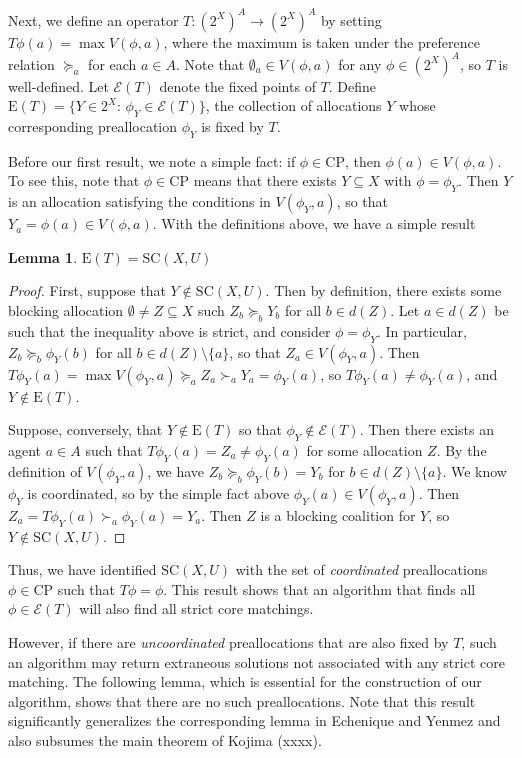 \documentclass[11pt,reqno]{amsart}
\newtheorem{lemma}[thm]{Lemma}
\theoremstyle{definition}
\numberwithin{equation}{section}
\newcommand{\prf}{\begin{proof}}
\newcommand{\eprf}{\end{proof}}
\newcommand{\pre}{\phi}
\newcommand{\coordpre}{\mathrm{CP}}
\newcommand{\prealloc}{(2^X)^A}
\newcommand{\sub}{\subseteq}
\newcommand{\strcore}{\mathrm{SC}(X,U)}
\newcommand{\fecon}{\mathrm{E}}
\newcommand{\fix}{\mathcal{E}}
\newcommand{\suq}{\succeq}
\newcommand{\su}{\succ}
\begin{document}
Next, we define an operator $T: \prealloc \to \prealloc$ by setting $T \pre(a) = \max V(\pre, a)$, where the maximum is taken under the preference relation $\suq_a$ for each $a \in A$.
Note that $\emptyset_a \in V(\pre,a)$ for any $\pre \in \prealloc$, so $T$ is well-defined. Let $\fix(T)$ denote the fixed points of $T$. Define $\fecon(T) = \{Y \in 2^X: \, \pre_Y \in \fix(T)\}$, the collection of allocations $Y$ whose corresponding preallocation $\pre_Y$ is fixed by $T$.

Before our first result, we note a simple fact: if $\pre \in \coordpre$, then $\pre(a) \in V(\pre, a)$.
To see this, note that $\pre \in \coordpre$ means that there exists $Y \sub X$ with $\pre = \pre_Y$. 
Then $Y$ is an allocation satisfying the conditions in $V(\pre_Y,a)$, so that $Y_a  = \pre(a) \in V(\pre,a)$. 
With the definitions above, we have a simple result
\begin{lemma} \label{lemma:strictcore}
$\fecon(T) = \strcore$
\end{lemma}
\prf
First, suppose that $Y \not \in \strcore$. Then by definition, there exists some blocking allocation $\emptyset \not = Z \sub X$ such $Z_b \suq_b Y_b$ for all $b \in d(Z)$.
Let $a \in d(Z)$ be such that the inequality above is strict, and consider $\pre = \pre_Y$. 
In particular, $Z_b \suq_b \pre_Y(b)$ for all $b \in d(Z) \setminus \{a\}$, so that $Z_a \in V(\pre_Y, a)$.
Then $T \pre_Y(a) = \max V(\pre_Y, a) \suq_a Z_a \su_a Y_a = \pre_Y(a)$, so $T\pre_Y(a) \not = \pre_Y(a)$, and $Y \not \in \fecon(T)$.  

Suppose, conversely, that $Y \not \in \fecon(T)$ so that $\pre_Y \not \in \fix(T)$.  
Then there exists an agent $a \in A$ such that $T\pre_Y(a) = Z_a \not = \pre_Y(a)$ for some allocation $Z$.  
By the definition of $V(\pre_Y,a)$, we have $Z_b \suq_b \pre_Y(b) = Y_b$ for $b \in d(Z) \setminus \{a\}$.
We know $\pre_Y$ is coordinated, so by the simple fact above $\pre_Y(a) \in V(\pre_Y,a)$.
Then $Z_a = T \pre_Y(a) \su_a \pre_Y(a) =  Y_a$. Then $Z$ is a blocking coalition for $Y$, so $Y \not \in \strcore$.  
\eprf
Thus, we have identified $\strcore$ with the set of \emph{coordinated} preallocations $\pre \in \coordpre$ such that $T \pre = \pre$. 
This result shows that an algorithm that finds all $\pre \in \fix(T)$ will also find all strict core matchings. 

However, if there are \emph{uncoordinated} preallocations that are also fixed by $T$, such an algorithm may return extraneous solutions not associated with any strict core matching.
The following lemma, which is essential for the construction of our algorithm, shows that there are no such preallocations.
Note that this result significantly generalizes the corresponding lemma in Echenique and Yenmez and also subsumes the main theorem of Kojima (xxxx). 
\end{document}
